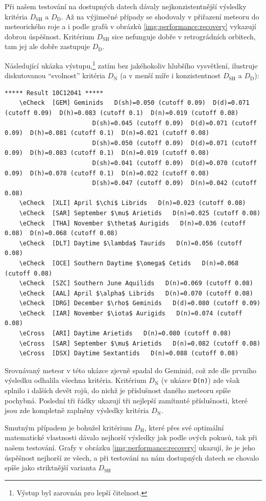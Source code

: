 \smallskip

Při našem testování na dostupných datech dávaly nejkonzistentnější výsledky kritéria $D_\text{SH}$ a $D_\text{D}$. Až na výjimečné případy se shodovaly v přiřazení meteoru do meteorického roje a i podle grafů v obrázků \ref{img:performance:recovery} vykazují dobrou úspěšnost. Kritérium $D_\text{SH}$ sice nefunguje dobře v retrográdních orbitech, tam jej ale dobře zastupuje $D_\text{D}$.

\medskip

Následující ukázka výstupu,\footnote{Výstup byl zarovnán pro lepší čitelnost.} zatím bez jakéhokoliv hlubšího vysvětlení, ilustruje diskutovanou "`svolnost"' kritéria $D_\text{N}$ (a v menší míře i konzistentnost $D_\text{SH}$ a $D_\text{D}$):
\begin{Verbatim}[commandchars=\\\{\},gobble=4,formatcom=\tiny,codes={\catcode`$=3\catcode`^=7},frame=lines]
    ***** Result 10C12041 *****
    \eCheck  [GEM] Geminids   D(sh)=0.050 (cutoff 0.09)  D(d)=0.071 (cutoff 0.09)  D(h)=0.083 (cutoff 0.1)  D(n)=0.019 (cutoff 0.08)
                        D(sh)=0.045 (cutoff 0.09)  D(d)=0.071 (cutoff 0.09)  D(h)=0.081 (cutoff 0.1)  D(n)=0.021 (cutoff 0.08)
                        D(sh)=0.050 (cutoff 0.09)  D(d)=0.071 (cutoff 0.09)  D(h)=0.083 (cutoff 0.1)  D(n)=0.019 (cutoff 0.08)
                        D(sh)=0.041 (cutoff 0.09)  D(d)=0.070 (cutoff 0.09)  D(h)=0.078 (cutoff 0.1)  D(n)=0.022 (cutoff 0.08)
                        D(sh)=0.047 (cutoff 0.09)  D(n)=0.042 (cutoff 0.08)
    \eCheck  [XLI] April $\chi$ Librids   D(n)=0.023 (cutoff 0.08)
    \eCheck  [SAR] September $\mu$ Arietids   D(n)=0.025 (cutoff 0.08)
    \eCheck  [THA] November $\theta$ Aurigids   D(n)=0.036 (cutoff 0.08)  D(n)=0.068 (cutoff 0.08)
    \eCheck  [DLT] Daytime $\lambda$ Taurids   D(n)=0.056 (cutoff 0.08)
    \eCheck  [OCE] Southern Daytime $\omega$ Cetids   D(n)=0.068 (cutoff 0.08)
    \eCheck  [SZC] Southern June Aquilids   D(n)=0.069 (cutoff 0.08)
    \eCheck  [AAL] April $\alpha$ Librids   D(n)=0.070 (cutoff 0.08)
    \eCheck  [DRG] December $\rho$ Geminids   D(d)=0.080 (cutoff 0.09)
    \eCheck  [IAR] November $\iota$ Aurigids   D(n)=0.074 (cutoff 0.08)
    \eCross  [ARI] Daytime Arietids   D(n)=0.080 (cutoff 0.08)
    \eCross  [SAR] September $\mu$ Arietids   D(n)=0.082 (cutoff 0.08)
    \eCross  [DSX] Daytime Sextantids   D(n)=0.088 (cutoff 0.08)
\end{Verbatim}
Srovnávaný meteor v této ukázce zjevně spadal do Geminid, což zde dle prvního výsledku odhalila všechna kritéria. Kritérium $D_\text{N}$ (v ukázce \texttt{D(n)}) zde však splnilo i dalších devět rojů, do nichž je příslušnost daného meteoru spíše pochybná. Poslední tři řádky ukazují tři nejlepší zamítnuté příslušnosti, které jsou zde kompletně zaplněny výsledky kritéria $D_\text{N}$. 

\medskip

Smutným případem je bohužel kritérium $D_\text{H}$, které přes své optimální matematické vlastnosti dávalo nejhorší výsledky jak podle \citeauthor{galligan}ových pokusů, tak při našem testování. Grafy v obrázku \ref{img:performance:recovery} ukazují, že je jeho úspěšnost nejhorší ze všech, a při testování na nám dostupných datech se chovalo spíše jako striktnější varianta $D_\text{SH}$